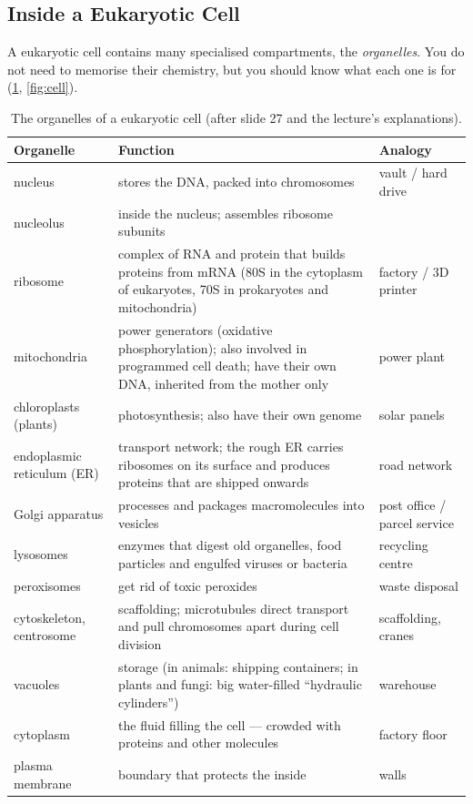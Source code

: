 \documentclass[11pt, oneside]{book}
\let\originalsubsection\subsection
\renewcommand{\subsection}{\Needspace{6\baselineskip}\originalsubsection}
\begin{document}
\subsection{Inside a Eukaryotic Cell}

A eukaryotic cell contains many specialised compartments, the
\emph{organelles}. You do not need to memorise their chemistry, but you
should know what each one is for (\cref{tab:organelles}, \cref{fig:cell}).

\begin{table}[htbp]
\centering
\small
\renewcommand{\arraystretch}{1.15}
\begin{tabular}{@{}p{3.3cm}p{6.6cm}p{3.9cm}@{}}
\toprule
\textbf{Organelle} & \textbf{Function} & \textbf{Analogy} \\
\midrule
nucleus & stores the DNA, packed into chromosomes & vault / hard drive \\
nucleolus & inside the nucleus; assembles ribosome subunits & \\
ribosome & complex of RNA and protein that builds proteins from mRNA (80S in the cytoplasm of eukaryotes, 70S in prokaryotes and mitochondria) & factory / 3D printer \\
mitochondria & power generators (oxidative phosphorylation); also involved in programmed cell death; have their own DNA, inherited from the mother only & power plant \\
chloroplasts (plants) & photosynthesis; also have their own genome & solar panels \\
endoplasmic reticulum (ER) & transport network; the rough ER carries ribosomes on its surface and produces proteins that are shipped onwards & road network \\
Golgi apparatus & processes and packages macromolecules into vesicles & post office / parcel service \\
lysosomes & enzymes that digest old organelles, food particles and engulfed viruses or bacteria & recycling centre \\
peroxisomes & get rid of toxic peroxides & waste disposal \\
cytoskeleton, centrosome & scaffolding; microtubules direct transport and pull chromosomes apart during cell division & scaffolding, cranes \\
vacuoles & storage (in animals: shipping containers; in plants and fungi: big water-filled ``hydraulic cylinders'') & warehouse \\
cytoplasm & the fluid filling the cell --- crowded with proteins and other molecules & factory floor \\
plasma membrane & boundary that protects the inside & walls \\
\bottomrule
\end{tabular}
\caption{The organelles of a eukaryotic cell (after slide 27 and the
lecture's explanations).}
\label{tab:organelles}
\end{table}
\end{document}
